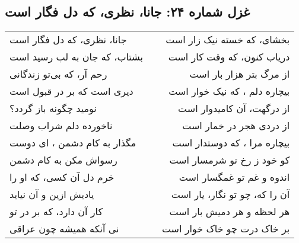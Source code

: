 \begin{center}
\section*{غزل شماره ۲۴: جانا، نظری، که دل فگار است}
\label{sec:024}
\begin{longtable}{l p{0.5cm} r}
جانا، نظری، که دل فگار است
&&
بخشای، که خسته نیک زار است
\\
بشتاب، که جان به لب رسید است
&&
دریاب کنون، که وقت کار است
\\
رحم آر، که بی‌تو زندگانی
&&
از مرگ بتر هزار بار است
\\
دیری است که بر در قبول است
&&
بیچاره دلم ، که نیک خوار است
\\
نومید چگونه باز گردد؟
&&
از درگهت، آن کامیدوار است
\\
ناخورده دلم شراب وصلت
&&
از دردی هجر در خمار است
\\
مگذار به کام دشمن ، ای دوست
&&
بیچاره مرا ، که دوستدار است
\\
رسواش مکن به کام دشمن
&&
کو خود ز رخ تو شرمسار است
\\
خرم دل آن کسی، که او را
&&
اندوه و غم تو غمگسار است
\\
یادیش ازین و آن نیاید
&&
آن را که، چو تو نگار، یار است
\\
کار آن دارد، که بر در تو
&&
هر لحظه و هر دمیش بار است
\\
نی آنکه همیشه چون عراقی
&&
بر خاک درت چو خاک خوار است
\\
\end{longtable}
\end{center}
